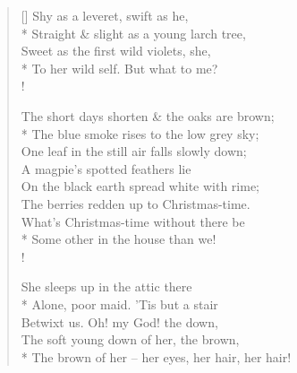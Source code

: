 \documentclass[MAIN]{subfiles}
\begin{document}
\begin{verse}[\versewidth]
\vin Shy as a leveret, swift as he,\\*
\vin Straight \& slight as a young larch tree,\\
\vin Sweet as the first wild violets, she,\\*
\vin To her wild self. But what to me?\\!

\vin The short days shorten \& the oaks are brown;\\*
\vin \vin The blue smoke rises to the low grey sky;\\
\vin One leaf in the still air falls slowly down;\\
\vin \vin A magpie's spotted feathers lie\\
\vin On the black earth spread white with rime;\\
\vin The berries redden up to Christmas-time.\\
\vin \vin What's Christmas-time without there be\\*
\vin \vin Some other in the house than we!\\!

\vin \vin She sleeps up in the attic there\\*
\vin \vin Alone, poor maid. 'Tis but a stair\\
\vin Betwixt us. Oh! my God! the down,\\
\vin The soft young down of her, the brown,\\*
The brown of her -- her eyes, her hair, her hair!
\end{verse}
\end{document}
